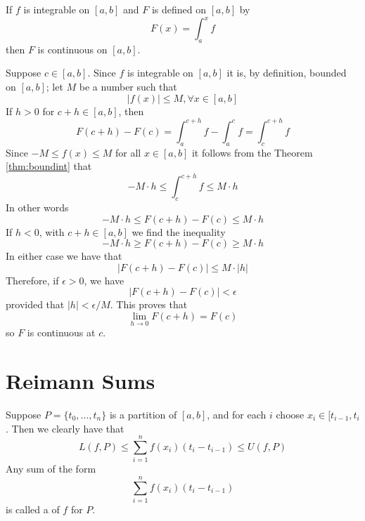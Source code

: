 \documentclass[12pt]{report}
\begin{document}
\begin{thm}{}{}
    If $f$ is integrable on $[a,b]$ and $F$ is defined on $[a,b]$ by \begin{equation*}
        F(x) = \int_a^xf
    \end{equation*}
    then $F$ is continuous on $[a,b]$.
\end{thm}
\begin{proof*}{}{}
    Suppose $c \in [a,b]$. Since $f$ is integrable on $[a,b]$ it is, by definition, bounded on $[a,b]$; let $M$ be a number such that \begin{equation*}
        |f(x)| \leq M,\forall x \in [a,b]
    \end{equation*}
    If $h > 0$ for $c+h \in [a,b]$, then \begin{equation*}
        F(c+h) - F(c) = \int_a^{c+h}f - \int_a^cf = \int_c^{c+h}f
    \end{equation*}
    Since $-M \leq f(x) \leq M$ for all $x \in [a,b]$ it follows from the Theorem \ref{thm:boundint} that \begin{equation*}
        -M\cdot h \leq \int_c^{c+h}f \leq M\cdot h
    \end{equation*}
    In other words \begin{equation*}
        -M\cdot h \leq F(c+h) - F(c) \leq M\cdot h
    \end{equation*}
    If $h < 0$, with $c+h \in [a,b]$ we find the inequality \begin{equation*}
        -M\cdot h \geq F(c+h) - F(c) \geq M\cdot h
    \end{equation*}
    In either case we have that \begin{equation*}
        |F(c+h) - F(c)| \leq M\cdot |h|
    \end{equation*}
    Therefore, if $\epsilon > 0$, we have \begin{equation*}
        |F(c+h) - F(c)| < \epsilon
    \end{equation*}
    provided that $|h| < \epsilon/M$. This proves that \begin{equation*}
        \lim\limits_{h\rightarrow 0}F(c+h) = F(c)
    \end{equation*}
    so $F$ is continuous at $c$.
\end{proof*}

\section{Reimann Sums}

\begin{defn}{}{}
    Suppose $P = \{t_0,...,t_n\}$ is a partition of $[a,b]$, and for each $i$ choose $x_i \in [t_{i-1},t_i$. Then we clearly have that \begin{equation}
        L(f,P) \leq \sum\limits_{i=1}^nf(x_i)(t_i-t_{i-1}) \leq U(f,P)
    \end{equation}
    Any sum of the form \begin{equation}
        \sum\limits_{i=1}^nf(x_i)(t_i-t_{i-1})
    \end{equation}
    is called a  of $f$ for $P$.
\end{defn}
\end{document}
